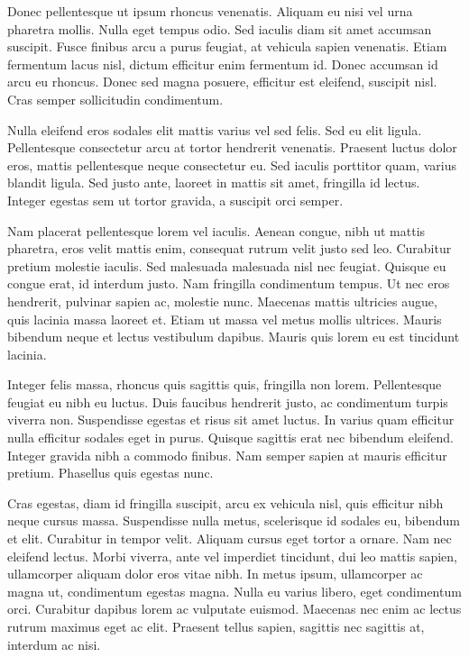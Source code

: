 \documentclass{article}
\begin{document}
Donec pellentesque ut ipsum rhoncus venenatis. Aliquam eu nisi vel urna
pharetra mollis. Nulla eget tempus odio. Sed iaculis diam sit amet
accumsan suscipit. Fusce finibus arcu a purus feugiat, at vehicula
sapien venenatis. Etiam fermentum lacus nisl, dictum efficitur enim
fermentum id. Donec accumsan id arcu eu rhoncus. Donec sed magna
posuere, efficitur est eleifend, suscipit nisl. Cras semper sollicitudin
condimentum.

Nulla eleifend eros sodales elit mattis varius vel sed felis. Sed eu
elit ligula. Pellentesque consectetur arcu at tortor hendrerit
venenatis. Praesent luctus dolor eros, mattis pellentesque neque
consectetur eu. Sed iaculis porttitor quam, varius blandit ligula. Sed
justo ante, laoreet in mattis sit amet, fringilla id lectus. Integer
egestas sem ut tortor gravida, a suscipit orci semper.

Nam placerat pellentesque lorem vel iaculis. Aenean congue, nibh ut
mattis pharetra, eros velit mattis enim, consequat rutrum velit justo
sed leo. Curabitur pretium molestie iaculis. Sed malesuada malesuada
nisl nec feugiat. Quisque eu congue erat, id interdum justo. Nam
fringilla condimentum tempus. Ut nec eros hendrerit, pulvinar sapien ac,
molestie nunc. Maecenas mattis ultricies augue, quis lacinia massa
laoreet et. Etiam ut massa vel metus mollis ultrices. Mauris bibendum
neque et lectus vestibulum dapibus. Mauris quis lorem eu est tincidunt
lacinia.

Integer felis massa, rhoncus quis sagittis quis, fringilla non lorem.
Pellentesque feugiat eu nibh eu luctus. Duis faucibus hendrerit justo,
ac condimentum turpis viverra non. Suspendisse egestas et risus sit amet
luctus. In varius quam efficitur nulla efficitur sodales eget in purus.
Quisque sagittis erat nec bibendum eleifend. Integer gravida nibh a
commodo finibus. Nam semper sapien at mauris efficitur pretium.
Phasellus quis egestas nunc.

Cras egestas, diam id fringilla suscipit, arcu ex vehicula nisl, quis
efficitur nibh neque cursus massa. Suspendisse nulla metus, scelerisque
id sodales eu, bibendum et elit. Curabitur in tempor velit. Aliquam
cursus eget tortor a ornare. Nam nec eleifend lectus. Morbi viverra,
ante vel imperdiet tincidunt, dui leo mattis sapien, ullamcorper aliquam
dolor eros vitae nibh. In metus ipsum, ullamcorper ac magna ut,
condimentum egestas magna. Nulla eu varius libero, eget condimentum
orci. Curabitur dapibus lorem ac vulputate euismod. Maecenas nec enim ac
lectus rutrum maximus eget ac elit. Praesent tellus sapien, sagittis nec
sagittis at, interdum ac nisi.
\end{document}
